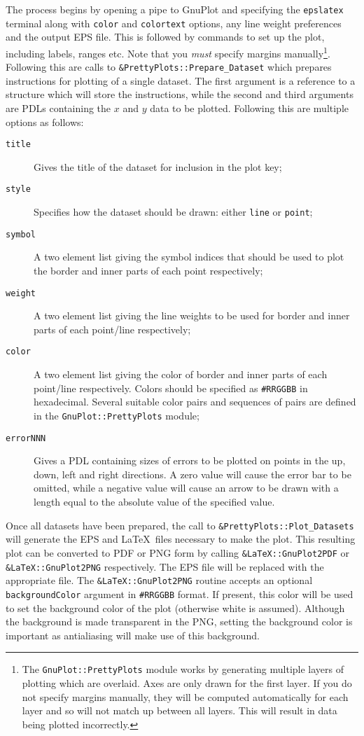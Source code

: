 The process begins by opening a pipe to {\sc GnuPlot} and specifying the {\tt epslatex} terminal along with {\tt color} and {\tt colortext} options, any line weight preferences and the output EPS file. This is followed by commands to set up the plot, including labels, ranges etc. Note that you \emph{must} specify margins manually\footnote{The {\tt GnuPlot::PrettyPlots} module works by generating multiple layers of plotting which are overlaid. Axes are only drawn for the first layer. If you do not specify margins manually, they will be computed automatically for each layer and so will not match up between all layers. This will result in data being plotted incorrectly.}. Following this are calls to {\tt \&PrettyPlots::Prepare\_Dataset} which prepares instructions for plotting of a single dataset. The first argument is a reference to a structure which will store the instructions, while the second and third arguments are PDLs containing the $x$ and $y$ data to be plotted. Following this are multiple options as follows:
\begin{description}
\item[{\tt title}] Gives the title of the dataset for inclusion in the plot key;
\item[{\tt style}] Specifies how the dataset should be drawn: either {\tt line} or {\tt point};
\item[{\tt symbol}] A two element list giving the symbol indices that should be used to plot the border and inner parts of each point respectively;
\item[{\tt weight}] A two element list giving the line weights to be used for border and inner parts of each point/line respectively;
\item[{\tt color}] A two element list giving the color of border and inner parts of each point/line respectively. Colors should be specified as {\tt \#RRGGBB} in hexadecimal. Several suitable color pairs and sequences of pairs are defined in the {\tt GnuPlot::PrettyPlots} module;
\item[{\tt errorNNN}] Gives a PDL containing sizes of errors to be plotted on points in the up, down, left and right directions. A zero value will cause the error bar to be omitted, while a negative value will cause an arrow to be drawn with a length equal to the absolute value of the specified value.
\end{description}
Once all datasets have been prepared, the call to {\tt \&PrettyPlots::Plot\_Datasets} will generate the EPS and \LaTeX\ files necessary to make the plot. This resulting plot can be converted to PDF or PNG form by calling {\tt \&LaTeX::GnuPlot2PDF} or {\tt \&LaTeX::GnuPlot2PNG} respectively. The EPS file will be replaced with the appropriate file. The {\tt \&LaTeX::GnuPlot2PNG} routine accepts an optional {\tt backgroundColor} argument in {\tt \#RRGGBB} format. If present, this color will be used to set the background color of the plot (otherwise white is assumed). Although the background is made transparent in the PNG, setting the background color is important as antialiasing will make use of this background.
